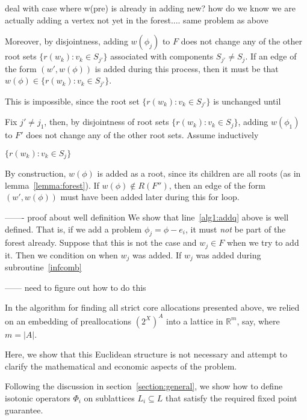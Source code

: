 \documentclass[11pt,reqno]{amsart}
\theoremstyle{definition}
\numberwithin{equation}{section}
\newcommand{\mr}{\mathbb{R}}
\newcommand{\pre}{\phi}
\newcommand{\prealloc}{(2^X)^A}
\newcommand{\sub}{\subseteq}
\newcommand{\strongcomp}{S}
\newcommand{\forest}{F}
\newcommand{\roott}{R}
\newcommand{\lattice}{L}
\begin{document}
deal with case where w(pre) is already in 
adding new? 
how do we know we are actually adding a vertex not yet in the forest....
same problem as above

Moreover, by disjointness, adding $w(\pre_j)$ to $\forest$ does not change any of the other root sets $\{r(w_k): v_k \in \strongcomp_{j'}\}$ associated with components $\strongcomp_{j'} \not = \strongcomp_j$. 
If an edge of the form $(w',w(\pre))$ is added during this process, then it must be that $w(\pre) \in \{r(w_k): v_k \in \strongcomp_{j'}\}$. 

This is impossible, since the root set $\{r(w_k): v_k \in \strongcomp_{j'}\}$ is unchanged until 

Fix $j' \not = j_1$, then, by disjointness of root sets $\{r(w_k): v_k \in \strongcomp_j\}$, adding $w(\pre_1)$ to $\forest'$ does not change any of the other root sets. 
Assume inductively 

$\{r(w_k): v_k \in \strongcomp_j\}$

By construction, $w(\pre)$ is added as a root, since its children are all roots (as in lemma~\ref{lemma:forest}). 
If $w(\pre) \not \in \roott(\forest'')$, then an edge of the form $(w',w(\pre))$ must have been added later during this for loop.  


------- proof about well definition 
We show that line~\ref{alg1:addq} above is well defined. 
That is, if we add a problem $\pre_j = \pre - e_i$, it must \emph{not} be part of the forest already. 
Suppose that this is not the case and $w_j \in \forest$ when we try to add it.
Then we condition on when $w_j$ was added. 
If $w_j$ was added during subroutine~\ref{infcomb}


------ need to figure out how to do this



In the algorithm for finding all strict core allocations presented above, we relied on an embedding of preallocations $\prealloc$ into a lattice in $\mr^m$, say, where $m = |A|$.

Here, we show that this Euclidean structure is not necessary and attempt to clarify the mathematical and economic aspects of the problem.

Following the discussion in section~\ref{section:general}, we show how to define isotonic operators $\Phi_i$ on sublattices $\lattice_i \sub \lattice$ that satisfy the required fixed point guarantee. 
\end{document}
